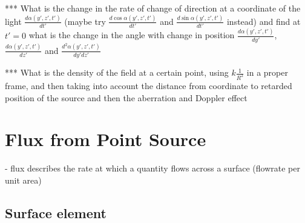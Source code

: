 *** What is the change in the rate of change of direction at a coordinate of the light $\frac{d\alpha(y',z',t')}{dt'}$ (maybe try $\frac{d\cos\alpha(y',z',t')}{dt'}$ and $\frac{d\sin\alpha(y',z',t')}{dt'}$ instead) and find at $t'=0$ what is the change in the angle with change in position $\frac{d\alpha(y',z',t')}{dy'}$, $\frac{d\alpha(y',z',t')}{dz'}$ and $\frac{d^2\alpha(y',z',t')}{dy'dz'}$

*** What is the density of the field at a certain point, using $k \frac{1}{R^2}$ in a proper frame, and then taking into account the distance from coordinate to retarded position of the source and then the aberration and Doppler effect

\section{Flux from Point Source}

- flux describes the rate at which a quantity flows across a surface (flowrate per unit area)

\subsection{Surface element}

